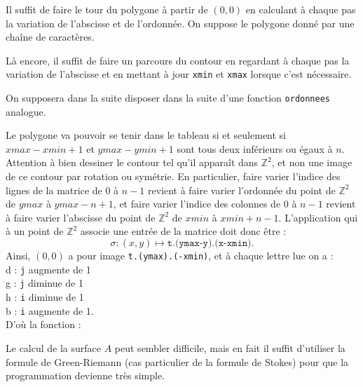 \Corrige

\Q
Il suffit de faire le tour du polygone à partir de $(0,0)$ en calculant à chaque pas la variation de l'abscisse et de l'ordonnée. On suppose le polygone donné par une chaîne de caractères.



\Q
Là encore, il suffit de faire un parcours du contour en regardant à chaque pas la variation de l'abscisse et en mettant à jour \texttt{xmin} et \texttt{xmax} lorsque c'est nécessaire.
\newpage



On supposera dans la suite disposer dans la suite d'une fonction \texttt{ordonnees} analogue.

\Q
Le polygone va pouvoir se tenir dans le tableau si et seulement si $xmax - xmin + 1$ et $ymax - ymin + 1$ sont tous deux inférieurs ou égaux à $n$. Attention à bien dessiner le contour tel qu'il apparaît dans $\mathbb{Z}^2$, et non une image de ce contour par rotation ou symétrie. En particulier, faire varier l'indice des lignes de la matrice de 0 à $n-1$ revient à faire varier l'ordonnée du point de $\mathbb{Z}^2$ de $ymax$ à $ymax-n+1$, et faire varier l'indice des colonnes de 0 à $n-1$ revient à faire varier l'abscisse du point de $\mathbb{Z}^2$ de $xmin$ à $xmin+n-1$. L'application qui à un point de $\mathbb{Z}^2$ associe une entrée de la matrice doit donc être :
\[
    \sigma : (x,y) \mapsto \texttt{t.(ymax-y).(x-xmin)}.
\]
Ainsi, $(0,0)$ a pour image \texttt{t.(ymax).(-xmin)}, et à chaque lettre lue on a :\\
\og d \fg{} : \texttt{j} augmente de 1\\
\og g \fg{} : \texttt{j} diminue de 1\\
\og h \fg{} : \texttt{i} diminue de 1\\
\og b \fg{} : \texttt{i} augmente de 1.\\
D'où la fonction :



\Q
Le calcul de la surface $A$ peut sembler difficile, mais en fait il suffit d'utiliser la formule de Green-Riemann (cas particulier de la formule de Stokes) pour que la programmation devienne très simple.

